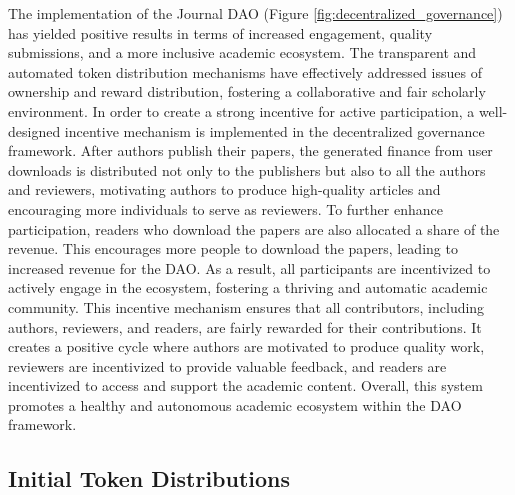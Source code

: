 \documentclass[lettersize,journal]{IEEEtran}
\begin{document}
The implementation of the Journal DAO (Figure \ref{fig:decentralized_governance}) has yielded positive results in terms of increased engagement, quality submissions, and a more inclusive academic ecosystem. The transparent and automated token distribution mechanisms have effectively addressed issues of ownership and reward distribution, fostering a collaborative and fair scholarly environment.
In order to create a strong incentive for active participation, a well-designed incentive mechanism is implemented in the decentralized governance framework. After authors publish their papers, the generated finance from user downloads is distributed not only to the publishers but also to all the authors and reviewers, motivating authors to produce high-quality articles and encouraging more individuals to serve as reviewers.
To further enhance participation, readers who download the papers are also allocated a share of the revenue. This encourages more people to download the papers, leading to increased revenue for the DAO. As a result, all participants are incentivized to actively engage in the ecosystem, fostering a thriving and automatic academic community.
This incentive mechanism ensures that all contributors, including authors, reviewers, and readers, are fairly rewarded for their contributions. It creates a positive cycle where authors are motivated to produce quality work, reviewers are incentivized to provide valuable feedback, and readers are incentivized to access and support the academic content. Overall, this system promotes a healthy and autonomous academic ecosystem within the DAO framework.

\subsection{Initial Token Distributions}
\end{document}
